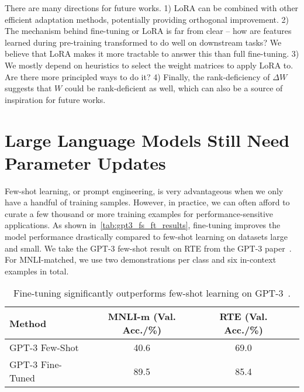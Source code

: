 There are many directions for future works.
1) LoRA can be combined with other efficient adaptation methods, potentially providing orthogonal improvement.
2) The mechanism behind fine-tuning or LoRA is far from clear -- how are features learned during pre-training transformed to do well on downstream tasks?
We believe that LoRA makes it more tractable to answer this than full fine-tuning.
3) We mostly depend on heuristics to select the weight matrices to apply LoRA to.
Are there more principled ways to do it?
4) Finally, the rank-deficiency of $\Delta W$ suggests that $W$ could be rank-deficient as well, which can also be a source of inspiration for future works.






\appendix

\section{Large Language Models Still Need Parameter Updates}
\label{app:fewshot_vs_finetune}

Few-shot learning, or prompt engineering, is very advantageous when we only have a handful of training samples.
However, in practice, we can often afford to curate a few thousand or more training examples for performance-sensitive applications.
As shown in~\autoref{tab:gpt3_fs_ft_results}, fine-tuning improves the model performance drastically compared to few-shot learning on datasets large and small.
We take the GPT-3 few-shot result on RTE from the GPT-3 paper~\citep{brown_language_2020}.
For MNLI-matched, we use two demonstrations per class and six in-context examples in total.


\begin{table}[h]
\centering
\begin{tabular}{l|ccc}
\hline
\toprule
Method           & MNLI-m (Val. Acc./\%) & RTE (Val. Acc./\%) \\
\midrule
GPT-3 Few-Shot   & 40.6 & 69.0 \\
GPT-3 Fine-Tuned & 89.5 & 85.4 \\
\bottomrule
\end{tabular}
\caption{Fine-tuning significantly outperforms few-shot learning on GPT-3~\citep{brown_language_2020}.  }
\label{tab:gpt3_fs_ft_results}
\end{table}



